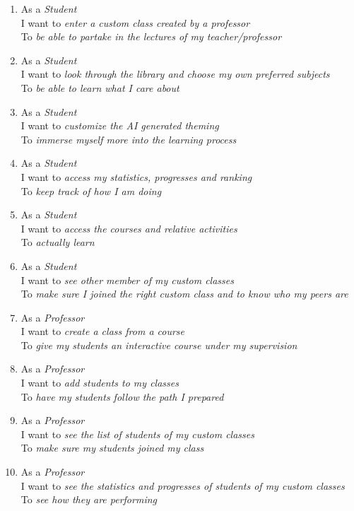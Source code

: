 \begin{enumerate}
	\item As a \textit{Student} \\
	I want to \textit{enter a custom class created by a professor} \\
	To \textit{be able to partake in the lectures of my teacher/professor}
	\item As a \textit{Student} \\
	I want to \textit{look through the library and choose my own preferred subjects} \\
	To \textit{be able to learn what I care about}
	\item As a \textit{Student} \\
	I want to \textit{customize the AI generated theming} \\
	To \textit{immerse myself more into the learning process}
	\item As a \textit{Student} \\
	I want to \textit{access my statistics, progresses and ranking} \\
	To \textit{keep track of how I am doing}
	\item As a \textit{Student} \\
	I want to \textit{access the courses and relative activities} \\
	To \textit{actually learn}
	\item As a \textit{Student} \\
	I want to \textit{see other member of my custom classes} \\
	To \textit{make sure I joined the right custom class and to know who my peers are}
	
	\item As a \textit{Professor} \\
	I want to \textit{create a class from a course} \\
	To \textit{give my students an interactive course under my supervision}
	\item As a \textit{Professor} \\
	I want to \textit{add students to my classes} \\
	To \textit{have my students follow the path I prepared}
	\item As a \textit{Professor} \\
	I want to \textit{see the list of students of my custom classes} \\
	To \textit{make sure my students joined my class}
	\item As a \textit{Professor} \\
	I want to \textit{see the statistics and progresses of students of my custom classes} \\
	To \textit{see how they are performing}
	

\end{enumerate}
